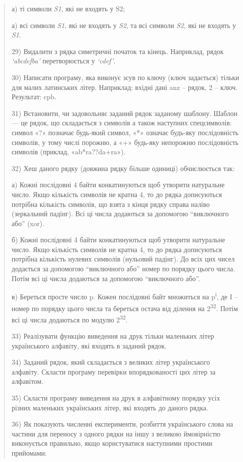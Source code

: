 \documentclass[]{article}
\begin{document}
\begin{quote}
а) ті символи \emph{S1}, які не входять у S2;

а) всі символи \emph{S1}, які не входять у \emph{S2}, та всі символи
\emph{S2}, які не входять у \emph{S1}.

29) Видалити з рядка симетричні початок та кінець. Наприклад, рядок
\emph{`abcdefba'} перетворюється у \emph{`cdef'}.

30) Написати програму, яка виконує зсув по ключу (ключ задається) тільки
для малих латинських літер. Наприклад: вхідні дані anz -- рядок, 2 --
ключ. Результат: cpb.

31) Встановити, чи задовольняє заданий рядок заданому шаблону. Шаблон
--- це рядок, що складається з символів а також наступних спецсимволів:
символ «?» позначає будь-який символ, «*» означає будь-яку послідовність
символів, у тому числі порожню, а «+» будь-яку непорожню послідовність
символів (приклад, «ab*ra??da+ra»).

32) Хеш даного рядку (довжина рядку більше одиниці) обчислюється так:

а) Кожні послідовні 4 байти конкатинуються щоб утворити натуральне
число. Якщо кількість символів не кратна 4, то до рядка дописуються
потрібна кількість символів, що взята з кінця рядку справа наліво
(зеркальний падінг). Всі ці числа додаються за допомогою ``виключного
або'' (xor).

б) Кожні послідовні 4 байти конкатинуються щоб утворити натуральне
число. Якщо кількість символів не кратна 4, то до рядка дописуються
потрібна кількість нулевих символів (нульовий падінг). До всіх цих чисел
додається за допомогою ``виключного або'' номер по порядку цього числа.
Потім всі ці числа додаються за допомогою ``виключного або''.

в) Береться просте число p. Кожен послідовні байт множиться на
p\textsuperscript{i}, де I -- номер по порядку цього числа та береться
остача від ділення на 2\textsuperscript{32}. Потім всі ці числа
додаються по модулю 2\textsuperscript{32}.

33) Реалізувати функцію виведення на друк тільки маленьких літер
українського алфавіту, які входять в заданий рядок.

34) Заданий рядок, який складається з великих літер українського
алфавіту. Скласти програму перевірки впорядкованості цих літер за
алфавітом.

35) Скласти програму виведення на друк в алфавітному порядку усіх різних
маленьких українських літер, які входять до даного рядка.

36) Як показують численні експерименти, розбиття українського слова на
частини для переносу з одного рядки на іншу з великою ймовірністю
виконується правильно, якщо користуватися наступними простими прийомами:
\end{quote}
\end{document}
